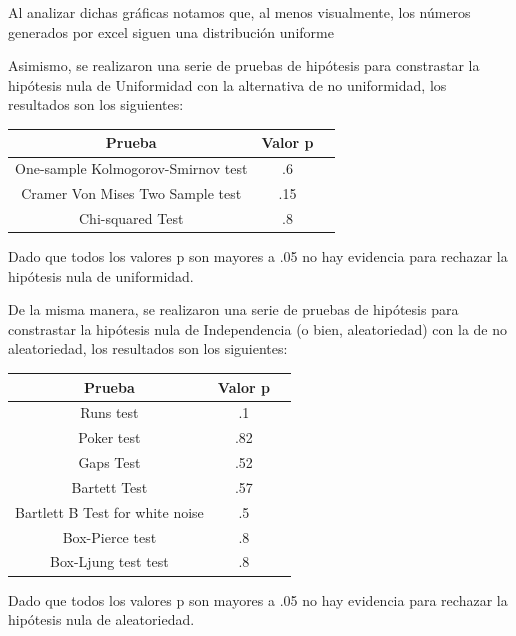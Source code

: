 \documentclass[12 pt]{article}\usepackage[]{graphicx}\usepackage[]{color}
\begin{document}
\begin{enumerate}
    Al analizar dichas gráficas notamos que, al menos visualmente, los números generados por excel siguen una distribución uniforme

    Asimismo, se realizaron una serie de pruebas de hipótesis para constrastar la hipótesis nula de Uniformidad con la alternativa de no uniformidad, los resultados son los siguientes:

    \begin{center}
        \begin{tabular}{|c|c|c|}
            \hline
            Prueba & Valor p \\
            \hline
            One-sample Kolmogorov-Smirnov test & .6  \\
            Cramer Von Mises Two Sample test & .15 \\
            Chi-squared Test & .8 \\
            \hline
        \end{tabular}
    \end{center}

    Dado que todos los valores p son mayores a .05 no hay evidencia para rechazar la hipótesis nula de uniformidad.

    De la misma manera, se realizaron una serie de pruebas de hipótesis para constrastar la hipótesis nula de Independencia (o bien, aleatoriedad) con la de no aleatoriedad, los resultados son los siguientes:


    \begin{center}
        \begin{tabular}{|c|c|c|}
            \hline
            Prueba & Valor p \\
            \hline
            Runs test & .1  \\
            Poker test & .82 \\
            Gaps Test & .52 \\
            Bartett Test & .57 \\
            Bartlett B Test for white noise & .5 \\
            Box-Pierce test& .8 \\
            Box-Ljung test test& .8 \\
            \hline
        \end{tabular}
    \end{center}

    Dado que todos los valores p son mayores a .05 no hay evidencia para rechazar la hipótesis nula de aleatoriedad.


\end{enumerate}
\end{document}
